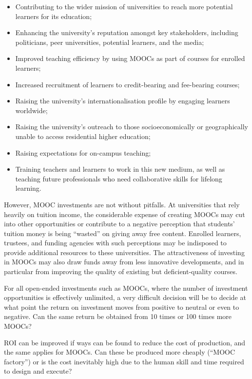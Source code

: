 \begin{itemize}

\item Contributing to the wider mission of universities to reach more
potential learners for its education;
\item Enhancing the university's reputation amongst key stakeholders, including politicians, peer
  universities, potential learners, and the media;
\item Improved teaching efficiency by using MOOCs as part of courses for enrolled learners;
\item Increased recruitment of learners to credit-bearing and fee-bearing courses;
\item Raising the university's internationalisation profile by engaging learners worldwide;
\item Raising the university's outreach to those socioeconomically or geographically unable to
  access residential higher education;
\item Raising expectations for on-campus teaching;
\item Training teachers and learners to work in this new medium, as well as teaching future
  professionals who need collaborative skills for lifelong learning.

\end{itemize}

However, MOOC investments are not without pitfalls.
At universities that rely heavily on tuition income, the considerable
expense of creating MOOCs may cut into other opportunities or
contribute to a negative perception that students' tuition money is
being ``wasted'' on giving away free content.
Enrolled learners, trustees, and funding agencies with such perceptions
may be indisposed to provide additional resources to these universities.
The attractiveness of investing in MOOCs may also draw funds away from less
innovative developments, and in particular from improving the quality of
existing but deficient-quality courses.
 
For all open-ended investments such as MOOCs, where the number of
investment opportunities is effectively unlimited, a very difficult
decision will be to decide at what point the return on investment moves
from positive to neutral or even to negative.  Can the same return be
obtained from 10 times or 100 times more MOOCs?
 
ROI can be improved if ways can be found to reduce the cost of
production, and the same applies for MOOCs.  Can these be produced more
cheaply (``MOOC factory'') or is the cost inevitably high due to the human
skill and time required to design and execute?


